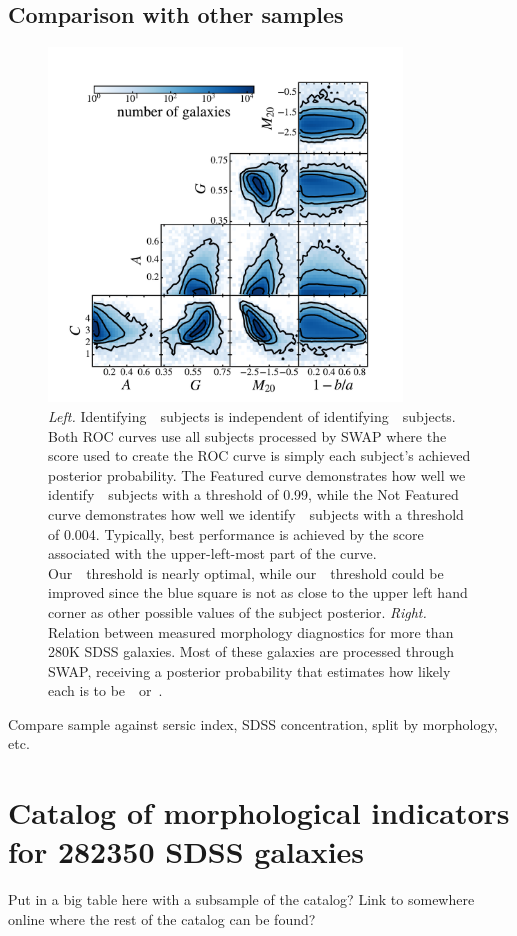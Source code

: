 \subsection{Comparison with other samples}
\begin{figure}[t!]
\includegraphics[width=3.7in]{Figures/human_machine/A2b.pdf}
\caption{\textit{Left.} Identifying~\feat~subjects is independent of identifying~\notfeat~subjects.  Both ROC curves use all subjects processed by SWAP where the score used to create the ROC curve is simply each subject's achieved posterior probability. The Featured curve demonstrates how well we identify~\feat~subjects with a threshold of 0.99, while the Not Featured curve demonstrates how well we identify~\notfeat~subjects with a threshold of 0.004. Typically, best performance is achieved by the score associated with the upper-left-most part of the curve. Our~\feat~threshold is nearly optimal, while our~\notfeat~threshold could be improved since the blue square is not as close to the upper left hand corner as other possible values of the subject posterior. \textit{Right.} Relation between measured morphology diagnostics for more than 280K SDSS galaxies. Most of these galaxies are processed through SWAP, receiving a posterior probability that estimates how likely each is to be~\feat~or~\notfeat.}
\label{fig: morph thresh}
\end{figure}


Compare sample against sersic index, SDSS concentration, split by morphology, etc. 


\section{Catalog of morphological indicators for 282350 SDSS galaxies}
Put in a big table here with a subsample of the catalog? Link to somewhere online where the rest of the catalog can be found? 


